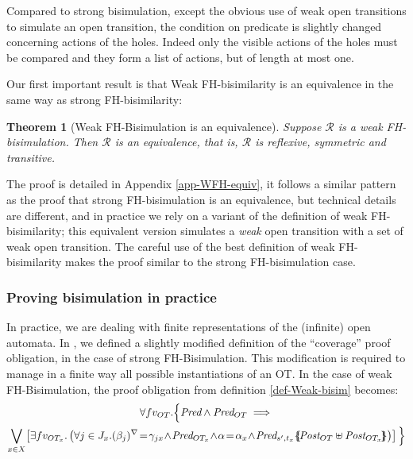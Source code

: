 \documentclass{lmcs}
\newtheorem{theorem}{Theorem}
\begin{document}
Compared to strong bisimulation, except the obvious use of weak open transitions to simulate an open transition, the condition on predicate is slightly changed concerning actions of the holes. Indeed only the visible actions of the holes must be compared and they form a list of actions, but of length at most one.




Our first important result is that Weak FH-bisimilarity is an equivalence in the same way as strong FH-bisimilarity:


\begin{theorem}[Weak FH-Bisimulation is an equivalence]\label{thm-weak-equiv} Suppose $\mathcal{R}$ 
is a weak FH-bisimulation. Then $\mathcal{R}$ is an equivalence, that is, $\mathcal{R}$ is 
reflexive, symmetric and transitive.
\end{theorem}
The proof  is detailed in Appendix \ref{app-WFH-equiv}, it follows a similar pattern as the proof that strong FH-bisimulation is an equivalence, but technical details are different, and in practice we rely on a variant of the definition of weak FH-bisimilarity; this equivalent version simulates a \emph{weak} open transition with a set of weak open transition. The careful use of the best definition of weak FH-bisimilarity makes the proof similar to the strong FH-bisimulation case.

\subsubsection*{Proving bisimulation in practice}

In practice, we are dealing with finite representations of the (infinite) open automata. In \cite{hou:hal-02406098}, we defined a slightly modified definition of the ``coverage'' proof obligation, in the case of strong FH-Bisimulation. This modification is required to manage in a finite way all possible instantiations of an OT. In the case of weak FH-Bisimulation, the proof obligation from definition \ref{def-Weak-bisim} becomes:
      \begin{multline*}
\forall fv_{OT}. \Big\{ \Pred \land \Pred_{OT} \implies\\
 \bigvee_{x\in X}\!
  \left[\exists fv_{OT_x}.
    \left( \forall j\in J_x. \vis{\beta_j}\!=\!\gamma_{jx}\! \land\! \Pred_{OT_x}
     \!\land\! \alpha\!=\!\alpha_x\! \land\!  
     \Pred_{s',t_x}\subst{\Post_{OT}\uplus\Post_{OT_x}}\right)\right]\Big\}
\end{multline*}
\end{document}
